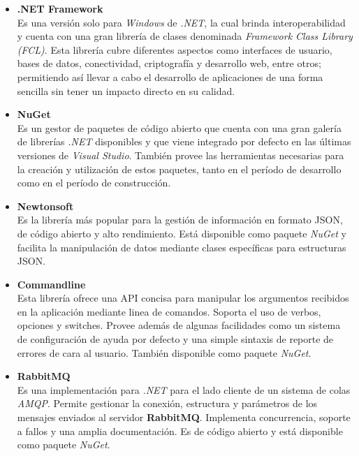             \begin{itemize}
                \item \textbf{.NET Framework} \\
                    Es una versión solo para \textit{Windows} de \textit{.NET}, la cual brinda interoperabilidad y cuenta con una gran librería de clases denominada \textit{Framework Class Library (FCL)}. Esta librería cubre diferentes aspectos como interfaces de usuario, bases de datos, conectividad, criptografía y desarrollo web, entre otros; permitiendo así llevar a cabo el desarrollo de aplicaciones de una forma sencilla sin tener un impacto directo en su calidad. \cite{netframework}
                
                \item \textbf{NuGet} \\
                    Es un gestor de paquetes de código abierto que cuenta con una gran galería de librerías \textit{.NET} disponibles y que viene integrado por defecto en las últimas versiones de \textit{Visual Studio}. También provee las herramientas necesarias para la creación y utilización de estos paquetes, tanto en el período de desarrollo como en el período de construcción. \cite{nuget1} \cite{nuget2}

                \item \textbf{Newtonsoft} \\
                    Es la librería más popular para la gestión de información en formato JSON, de código abierto y alto rendimiento. Está disponible como paquete \textit{NuGet} y facilita la manipulación de datos mediante clases específicas para estructuras JSON. \cite{newtonsoft}

                \item \textbf{Commandline} \\
                    Esta librería ofrece una API concisa para manipular los argumentos recibidos en la aplicación mediante linea de comandos. Soporta el uso de verbos, opciones y switches. Provee además de algunas facilidades como un sistema de configuración de ayuda por defecto y una simple sintaxis de reporte de errores de cara al usuario. También disponible como paquete \textit{NuGet}. \cite{commandline1} \cite{commandline2}
                    
                \item \textbf{RabbitMQ} \\
                    Es una implementación para \textit{.NET} para el lado cliente de un sistema de colas \textit{AMQP}. Permite gestionar la conexión, estructura y parámetros de los mensajes enviados al servidor \textbf{RabbitMQ}. Implementa concurrencia, soporte a fallos y una amplia documentación. Es de código abierto y está disponible como paquete \textit{NuGet}. \cite{rabbitmq}
                    

\end{itemize}

